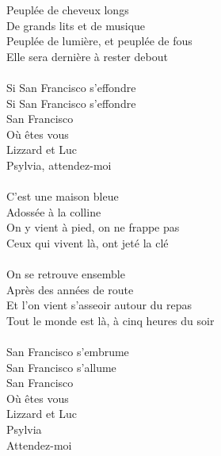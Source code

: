 Peuplée de cheveux longs\\
De grands lits et de musique\\
Peuplée de lumière, et peuplée de fous\\
Elle sera dernière à rester debout\\\\
Si San Francisco s'effondre\\
Si San Francisco s'effondre\\
San Francisco\\
Où êtes vous\\
Lizzard et Luc\\
Psylvia, attendez-moi\\\\
C'est une maison bleue\\
Adossée à la colline\\
On y vient à pied, on ne frappe pas\\
Ceux qui vivent là, ont jeté la clé\\\\
On se retrouve ensemble\\
Après des années de route\\
Et l'on vient s'asseoir autour du repas\\
Tout le monde est là, à cinq heures du soir\\\\
San Francisco s'embrume\\
San Francisco s'allume\\
San Francisco\\
Où êtes vous\\
Lizzard et Luc\\
Psylvia\\
Attendez-moi
